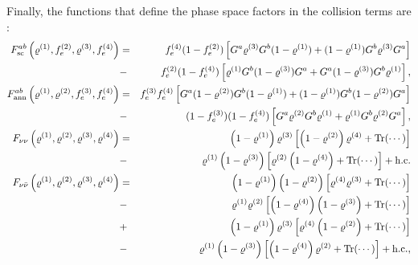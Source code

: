 \documentclass[notitlepage,nofootinbib,showpacs,preprintnumbers,amsmath,amssymb,superscriptaddress,prd,onecolumn]{revtex4-1}
\begin{document}
Finally, the functions that define the phase space factors in the collision terms are \cite{deSalas:2016ztq,Bennett:2020zkv}:
\begin{eqnarray}
F_{\rm sc}^{ab}\left(\varrho^{(1)}, f_e^{(2)}, \varrho^{(3)}, f_e^{(4)}\right)
&=&
f_e^{(4)}(1-f_e^{(2)})\left[G^a\varrho^{(3)}G^b(1-\varrho^{(1)})+(1-\varrho^{(1)})G^b\varrho^{(3)}G^a\right]
\nonumber\\
&-&
f_e^{(2)}(1-f_e^{(4)})\left[\varrho^{(1)}G^b(1-\varrho^{(3)})G^a+G^a(1-\varrho^{(3)})G^b\varrho^{(1)}\right],
\label{eq:F_ab_sc}\\
F_{\rm ann}^{ab}\left(\varrho^{(1)}, \varrho^{(2)}, f_e^{(3)}, f_e^{(4)}\right)
&=&
f_e^{(3)}f_e^{(4)}\left[G^a(1-\varrho^{(2)})G^b(1-\varrho^{(1)})+(1-\varrho^{(1)})G^b(1-\varrho^{(2)})G^a\right]
\nonumber\\
&-&
(1-f_e^{(3)})(1-f_e^{(4)})\left[G^a\varrho^{(2)}G^b\varrho^{(1)}+\varrho^{(1)}G^b\varrho^{(2)}G^a\right],
\label{eq:F_ab_ann}
\\
F_{\nu\nu}\left(\varrho^{(1)}, \varrho^{(2)}, \varrho^{(3)}, \varrho^{(4)}\right)
&=&
\left(1-\varrho^{(1)}\right)\varrho^{(3)}
\left[\left(1-\varrho^{(2)}\right)\varrho^{(4)}+\mathrm{Tr}(\cdots)\right]
\nonumber\\
&-&
\varrho^{(1)}\left(1-\varrho^{(3)}\right)
\left[\varrho^{(2)}\left(1-\varrho^{(4)}\right)+\mathrm{Tr}(\cdots)\right]
+\mathrm{h.c.}
\label{eq:F_nunu}\\
F_{\nu\bar\nu}\left(\varrho^{(1)}, \varrho^{(2)}, \varrho^{(3)}, \varrho^{(4)}\right)
&=&
\left(1-\varrho^{(1)}\right)\left(1-\varrho^{(2)}\right)
\left[\varrho^{(4)}\varrho^{(3)}+\mathrm{Tr}(\cdots)\right]
\nonumber\\
&-&
\varrho^{(1)}\varrho^{(2)}
\left[\left(1-\varrho^{(4)}\right)\left(1-\varrho^{(3)}\right)+\mathrm{Tr}(\cdots)\right]
\nonumber\\
&+&
\left(1-\varrho^{(1)}\right)\varrho^{(3)}
\left[\varrho^{(4)}\left(1-\varrho^{(2)}\right)+\mathrm{Tr}(\cdots)\right]
\nonumber\\
&-&
\varrho^{(1)}\left(1-\varrho^{(3)}\right)
\left[\left(1-\varrho^{(4)}\right)\varrho^{(2)}+\mathrm{Tr}(\cdots)\right]
+\mathrm{h.c.},
\label{eq:F_nubarnu}
\end{eqnarray}
\end{document}

